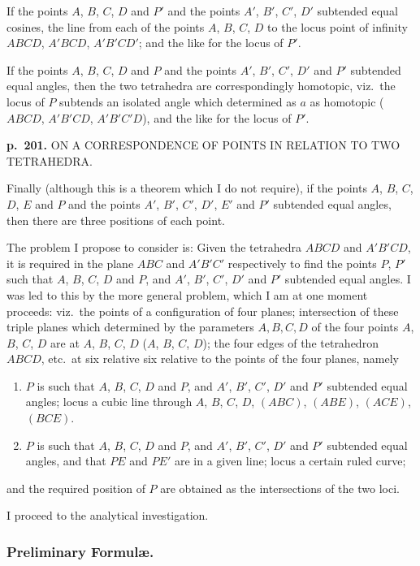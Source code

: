 \documentclass[11pt,a4paper]{article}
\begin{document}
If the points $A$, $B$, $C$, $D$ and $P'$ and the points $A'$, $B'$, $C'$, $D'$ subtended equal cosines, the line from each of the points $A$, $B$, $C$, $D$ to the locus point of infinity $ABCD$, $A'BCD$, $A'B'CD'$; and the like for the locus of $P'$.

If the points $A$, $B$, $C$, $D$ and $P$ and the points $A'$, $B'$, $C'$, $D'$ and $P'$ subtended equal angles, then the two tetrahedra are correspondingly homotopic, viz.\ the locus of $P$ subtends an isolated angle which determined as $a$ as homotopic ($ABCD$, $A'B'CD$, $A'B'C'D$), and the like for the locus of $P'$.

\clearpage

\noindent
\textbf{p.~201.}  ON A CORRESPONDENCE OF POINTS IN RELATION TO TWO TETRAHEDRA.

Finally (although this is a theorem which I do not require), if the points $A$, $B$, $C$, $D$, $E$ and $P$ and the points $A'$, $B'$, $C'$, $D'$, $E'$ and $P'$ subtended equal angles, then there are three positions of each point.

The problem I propose to consider is: Given the tetrahedra $ABCD$ and $A'B'CD$, it is required in the plane $ABC$ and $A'B'C'$ respectively to find the points $P$, $P'$ such that $A$, $B$, $C$, $D$ and $P$, and $A'$, $B'$, $C'$, $D'$ and $P'$ subtended equal angles. I was led to this by the more general problem, which I am at one moment proceeds: viz.\ the points of a configuration of four planes; intersection of these triple planes which determined by the parameters $A, B, C, D$ of the four points $A$, $B$, $C$, $D$ are at $A$, $B$, $C$, $D$ ($A$, $B$, $C$, $D$); the four edges of the tetrahedron $ABCD$, etc.\ at six relative six relative to the points of the four planes, namely
\begin{enumerate}[label=\arabic*.]
\item $P$ is such that $A$, $B$, $C$, $D$ and $P$, and $A'$, $B'$, $C'$, $D'$ and $P'$ subtended equal angles; locus a cubic line through $A$, $B$, $C$, $D$, $(ABC)$, $(ABE)$, $(ACE)$, $(BCE)$.
\item $P$ is such that $A$, $B$, $C$, $D$ and $P$, and $A'$, $B'$, $C'$, $D'$ and $P'$ subtended equal angles, and that $PE$ and $PE'$ are in a given line; locus a certain ruled curve;
\end{enumerate}
and the required position of $P$ are obtained as the intersections of the two loci.

I proceed to the analytical investigation.

\subsubsection*{Preliminary Formul\ae.}
\end{document}

